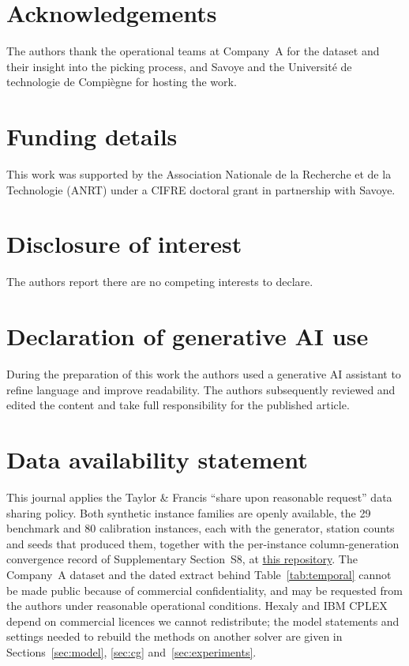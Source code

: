 \documentclass[]{interact}
\begin{document}
\section*{Acknowledgements}
The authors thank the operational teams at Company~A for the dataset and their insight into the picking process, and Savoye and the Universit\'{e} de technologie de Compi\`{e}gne for hosting the work.

\section*{Funding details}
This work was supported by the Association Nationale de la Recherche et de la Technologie (ANRT) under a CIFRE doctoral grant in partnership with Savoye.

\section*{Disclosure of interest}
The authors report there are no competing interests to declare.

\section*{Declaration of generative AI use}
During the preparation of this work the authors used a generative AI assistant to refine language and improve readability. The authors subsequently reviewed and edited the content and take full responsibility for the published article.

\section*{Data availability statement}
This journal applies the Taylor \& Francis ``share upon reasonable request'' data sharing policy. Both synthetic instance families are openly available, the 29 benchmark and 80 calibration instances, each with the generator, station counts and seeds that produced them, together with the per-instance column-generation convergence record of Supplementary Section~S8, at \href{https://anonymous.4open.science/r/Anonymized_Export_CSLAP_v2-01BC/README.md}{this repository}. The Company~A dataset and the dated extract behind Table~\ref{tab:temporal} cannot be made public because of commercial confidentiality, and may be requested from the authors under reasonable operational conditions. Hexaly and IBM CPLEX depend on commercial licences we cannot redistribute; the model statements and settings needed to rebuild the methods on another solver are given in Sections~\ref{sec:model}, \ref{sec:cg} and~\ref{sec:experiments}.
\end{document}
